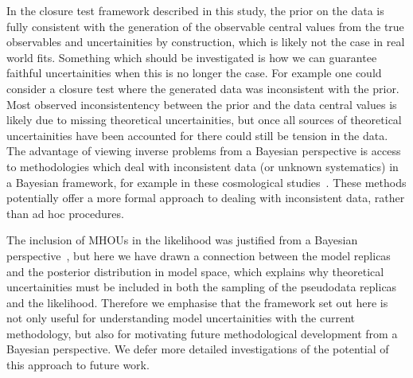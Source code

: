 In the closure test framework described in this study, the prior on the
data is fully consistent with the generation of the 
observable central values from the true observables and uncertainities
by construction, which is likely not the case in real world fits. Something
which should be investigated is how we can guarantee faithful uncertainities when this
is no longer the case. For example one could consider
a closure test where the generated data was inconsistent with the prior.
Most observed inconsistentency between the prior and the data
central values is likely due to missing theoretical uncertainities, but
once all sources of theoretical uncertainities have been accounted for
there could still be tension in the data. The advantage of viewing
inverse problems from a Bayesian perspective is access to
methodologies which deal with inconsistent data (or unknown
systematics) in a Bayesian framework,
for example in these cosmological studies~\cite{Luis_Bernal_2018, Hobson_2002}.
These methods potentially offer a more formal approach to dealing with
inconsistent data, rather than ad hoc procedures.

The inclusion of MHOUs in the likelihood was justified from a Bayesian
perspective~\cite{AbdulKhalek:2019ihb}, but here we have drawn a connection
between the model replicas and the posterior distribution in model space,
which explains why theoretical uncertainities
must be included in both the sampling of the pseudodata replicas and the
likelihood. Therefore we emphasise that the framework set out here is not
only useful for understanding model uncertainities with the current
methodology, but also for motivating future methodological development from
a Bayesian perspective. We defer more detailed investigations of the potential of 
this approach to future work. 

